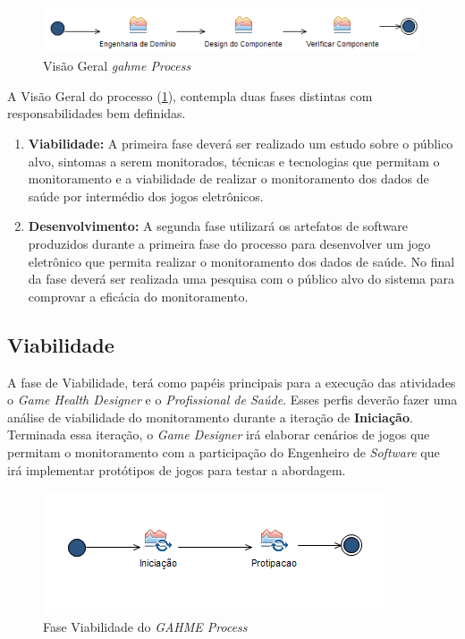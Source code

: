 \begin{figure}
 \centering
 \includegraphics[scale=0.8]{./img/visaogeral.png}
\caption{Visão Geral \textit{\ac{gahme} Process}}
 \label{fig:visaogeral}
\end{figure}

A Visão Geral do processo (\ref{fig:visaogeral}), contempla duas fases distintas  com responsabilidades bem definidas. 
	\begin{enumerate}
		\item \textbf{Viabilidade:} A primeira fase deverá ser realizado um estudo sobre o público alvo, sintomas a serem monitorados, técnicas e tecnologias que permitam o monitoramento e a viabilidade de realizar o monitoramento dos dados de saúde por intermédio dos jogos eletrônicos.		
		\item \textbf{Desenvolvimento:} A segunda fase utilizará os artefatos de software produzidos durante a primeira fase do processo para desenvolver um jogo eletrônico que permita realizar o monitoramento dos dados de saúde. No final da fase deverá ser realizada uma pesquisa com o público alvo do sistema para comprovar a eficácia do monitoramento.
	\end{enumerate}


\subsection{Viabilidade}\label{sec:viabilidade}
A fase de Viabilidade, terá como papéis principais para a execução das atividades o \textit{Game Health Designer} e o \textit{Profissional de Saúde}. Esses perfis deverão fazer uma análise de viabilidade do monitoramento durante a iteração de \textbf{Iniciação}. Terminada essa iteração, o \textit{Game Designer} irá elaborar cenários de jogos que permitam o monitoramento com a participação do Engenheiro de \textit{Software} que irá implementar protótipos de jogos para testar a abordagem. 

\begin{figure}
 \centering
 \includegraphics[scale=0.8]{./img/fase-viabilidade.png}
\caption{Fase Viabilidade do \textit{GAHME Process}}
 \label{fig:faseviabilidade}
\end{figure}

